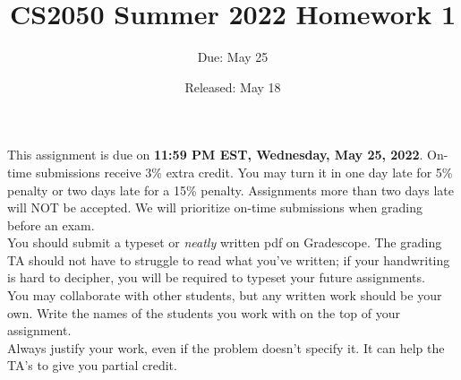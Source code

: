\documentclass{article}
\title{CS2050 Summer 2022 Homework 1}
\author{Due: May 25}
\date{Released: May 18}
\begin{document}
\maketitle

This assignment is due on \textbf{11:59 PM EST, Wednesday, May 25, 2022}.  On-time submissions receive 3\% extra credit. You may turn it in one day late for 5\% penalty or two days late for a 15\% penalty. Assignments more than two days late will NOT be accepted.  We will prioritize on-time submissions when grading before an exam. \\ 

You should submit a typeset or \emph{neatly} written pdf on Gradescope.  The grading TA should not have to struggle to read what you've written; if your handwriting is hard to decipher, you will be required to typeset your future assignments.\\ 

You may collaborate with other students, but any written work should be your own. Write the names of the students you work with on the top of your assignment.\\

Always justify your work, even if the problem doesn't specify it. It can help the TA's to give you partial credit.



\clearpage
\end{document}
